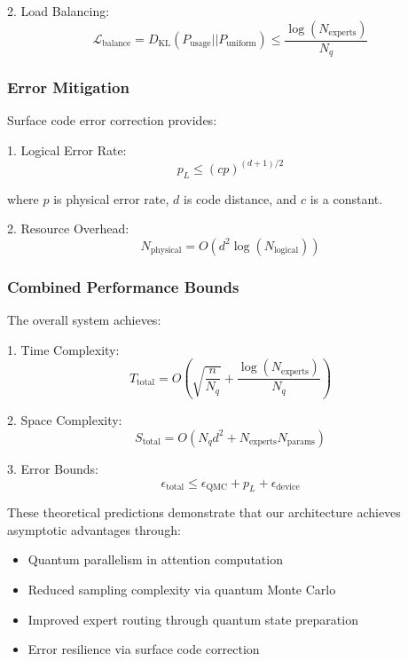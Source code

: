 \documentclass{article}
\begin{document}
2. Load Balancing:
\begin{equation}
\mathcal{L}_{\text{balance}} = D_{\text{KL}}(P_{\text{usage}}||P_{\text{uniform}}) \leq \frac{\log(N_{\text{experts}})}{N_q}
\end{equation}

\subsubsection{Error Mitigation}
Surface code error correction provides:

1. Logical Error Rate:
\begin{equation}
p_L \leq (cp)^{(d+1)/2}
\end{equation}

where $p$ is physical error rate, $d$ is code distance, and $c$ is a constant.

2. Resource Overhead:
\begin{equation}
N_{\text{physical}} = O(d^2\log(N_{\text{logical}}))
\end{equation}

\subsubsection{Combined Performance Bounds}
The overall system achieves:

1. Time Complexity:
\begin{equation}
T_{\text{total}} = O\left(\sqrt{\frac{n}{N_q}} + \frac{\log(N_{\text{experts}})}{N_q}\right)
\end{equation}

2. Space Complexity:
\begin{equation}
S_{\text{total}} = O(N_q d^2 + N_{\text{experts}}N_{\text{params}})
\end{equation}

3. Error Bounds:
\begin{equation}
\epsilon_{\text{total}} \leq \epsilon_{\text{QMC}} + p_L + \epsilon_{\text{device}}
\end{equation}

These theoretical predictions demonstrate that our architecture achieves asymptotic advantages through:
\begin{itemize}
\item Quantum parallelism in attention computation
\item Reduced sampling complexity via quantum Monte Carlo
\item Improved expert routing through quantum state preparation
\item Error resilience via surface code correction
\end{itemize}
\end{document}
